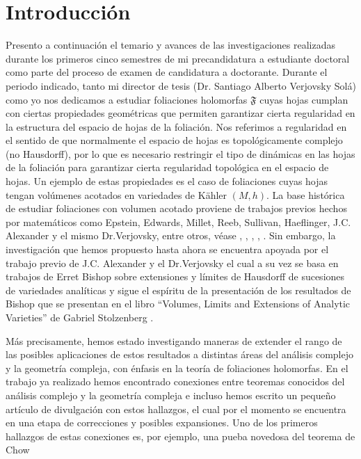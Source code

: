 \documentclass{article}
\begin{document}
\section{Introducci\'on}
\noindent Presento a continuaci\'on el temario y avances de las investigaciones realizadas durante los primeros cinco semestres 
de mi precandidatura a estudiante doctoral como parte del proceso de examen de candidatura a doctorante.
Durante el periodo indicado, tanto mi director de tesis (Dr. Santiago Alberto Verjovsky Sol\'a) como yo nos dedicamos a estudiar 
foliaciones holomorfas $\mathfrak{F}$ cuyas hojas cumplan con ciertas propiedades geom\'etricas que permiten garantizar cierta regularidad en 
la estructura del espacio de hojas de la foliaci\'on. Nos referimos a regularidad en el sentido de que normalmente el 
espacio de hojas es topol\'ogicamente complejo (no Hausdorff), por lo que es necesario restringir el tipo de din\'amicas en las hojas 
de la foliaci\'on para garantizar cierta regularidad topol\'ogica en el espacio de hojas. Un ejemplo de estas propiedades es el caso de foliaciones cuyas hojas tengan 
vol\'umenes acotados en variedades de K\"ahler $(M,h)$. 
La base hist\'orica de estudiar foliaciones con volumen acotado proviene de trabajos previos hechos por matem\'aticos como
Epstein, Edwards, Millet, Reeb, Sullivan, Haeflinger, J.C. Alexander y el mismo Dr.Verjovsky, entre otros, v\'ease \cite{Epstein1}, \cite{Epstein2}, \cite{EMS}, \cite{E-V}, \cite{V-A}. 
Sin embargo, la investigaci\'on que hemos propuesto hasta ahora se encuentra apoyada por el trabajo previo de J.C. Alexander y el 
Dr.Verjovsky \cite{V-A} el cual a su vez se basa en trabajos de Erret Bishop \cite{Bishop} sobre extensiones y l\'imites de Hausdorff 
de sucesiones de variedades anal\'iticas y sigue el esp\'iritu de la presentaci\'on de los resultados de Bishop que se presentan en el 
libro ``Volumes, Limits and Extensions of Analytic Varieties'' de Gabriel Stolzenberg \cite{Stolzenberg}.

M\'as precisamente, hemos estado investigando maneras de extender el rango de las posibles aplicaciones de estos resultados a
distintas \'areas del an\'alisis complejo y la geometr\'ia compleja, con \'enfasis en la teor\'ia de foliaciones holomorfas. En el trabajo
ya realizado hemos encontrado conexiones entre teoremas conocidos del an\'alisis complejo y la geometr\'ia compleja e incluso hemos
escrito un pequeño art\'iculo de divulgaci\'on con estos hallazgos, el cual por el momento se encuentra en una etapa de correcciones
y posibles expansiones. Uno de los primeros hallazgos de estas conexiones es, por ejemplo, una pueba novedosa del teorema 
de Chow \cite{Chow}
\end{document}

